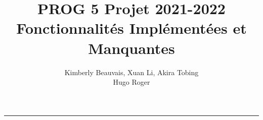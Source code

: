 \documentclass[a4paper]{article} %
\title{PROG 5 Projet 2021-2022 \\
\large Fonctionnalités Implémentées et Manquantes}
\author{Kimberly Beauvais, Xuan Li, Akira Tobing \\
Hugo Roger}
\begin{document}
\maketitle
\begin{center}
\rule{\textwidth}{1pt}
\end{center}

\renewcommand{\contentsname}{Table des Matières}
\tableofcontents

\newpage
\end{document}
